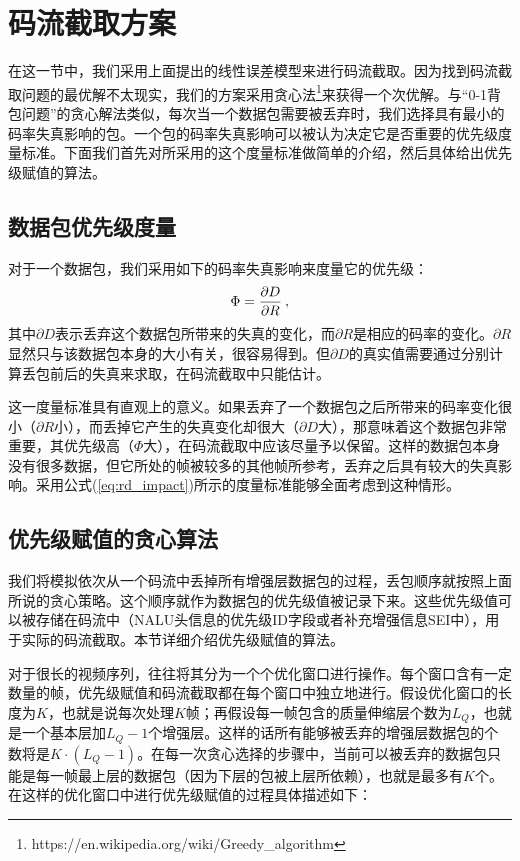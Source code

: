 \section{码流截取方案}
\label{extraction}

在这一节中，我们采用上面提出的线性误差模型来进行码流截取。因为找到码流截取问题的最优解不太现实，我们的方案采用贪心法\footnote{https://en.wikipedia.org/wiki/Greedy\_algorithm}来获得一个次优解。与“0-1背包问题”的贪心解法类似，每次当一个数据包需要被丢弃时，我们选择具有最小的码率失真影响的包。一个包的码率失真影响可以被认为决定它是否重要的优先级度量标准。下面我们首先对所采用的这个度量标准做简单的介绍，然后具体给出优先级赋值的算法。

\subsection{数据包优先级度量}

对于一个数据包，我们采用如下的码率失真影响来度量它的优先级：
\begin{equation}
\vspace{10pt}
\label{eq:rd_impact}
\Phi = \dfrac{\partial D}{\partial R} \: ,
\end{equation}
其中$\partial D$表示丢弃这个数据包所带来的失真的变化，而$\partial R$是相应的码率的变化。$\partial R$显然只与该数据包本身的大小有关，很容易得到。但$\partial D$的真实值需要通过分别计算丢包前后的失真来求取，在码流截取中只能估计。

这一度量标准具有直观上的意义。如果丢弃了一个数据包之后所带来的码率变化很小（$\partial R$小），而丢掉它产生的失真变化却很大（$\partial D$大），那意味着这个数据包非常重要，其优先级高（$\Phi$大），在码流截取中应该尽量予以保留。这样的数据包本身没有很多数据，但它所处的帧被较多的其他帧所参考，丢弃之后具有较大的失真影响。采用公式(\ref{eq:rd_impact})所示的度量标准能够全面考虑到这种情形。

\subsection{优先级赋值的贪心算法}
\label{subsec:priority-assign}

我们将模拟依次从一个码流中丢掉所有增强层数据包的过程，丢包顺序就按照上面所说的贪心策略。这个顺序就作为数据包的优先级值被记录下来。这些优先级值可以被存储在码流中（NALU头信息的优先级ID字段或者补充增强信息SEI中），用于实际的码流截取。本节详细介绍优先级赋值的算法。

对于很长的视频序列，往往将其分为一个个优化窗口进行操作。每个窗口含有一定数量的帧，优先级赋值和码流截取都在每个窗口中独立地进行。假设优化窗口的长度为$K$，也就是说每次处理$K$帧；再假设每一帧包含的质量伸缩层个数为$L_Q$，也就是一个基本层加$L_Q-1$个增强层。这样的话所有能够被丢弃的增强层数据包的个数将是$K \cdot (L_Q-1)$。在每一次贪心选择的步骤中，当前可以被丢弃的数据包只能是每一帧最上层的数据包（因为下层的包被上层所依赖），也就是最多有$K$个。在这样的优化窗口中进行优先级赋值的过程具体描述如下：

